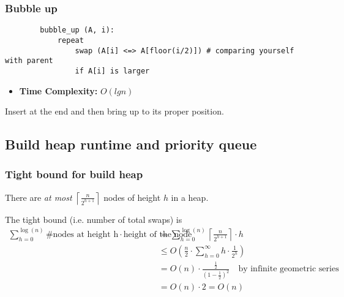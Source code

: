     \subsubsection{Bubble up}
    \begin{definition}
        \begin{lstlisting}
        bubble_up (A, i):
            repeat
                swap (A[i] <=> A[floor(i/2)]) # comparing yourself with parent
                if A[i] is larger
        \end{lstlisting}
        \begin{itemize}
            \item \textbf{Time Complexity:} $O(lg n)$
        \end{itemize}
    \end{definition}
    
    \begin{intuition}
        Insert at the end and then bring up to its proper position.
    \end{intuition}

\subsection{Build heap runtime and priority queue}
    \subsubsection{Tight bound for build heap}
    \begin{definition}
        There are \emph{at most} \( \left\lceil \frac{n}{2^{h+1}} \right\rceil \) nodes of height \( h \) in a heap.
        \vspace{1em}

        The tight bound (i.e. number of total swaps) is
        \begin{align*}
            \sum_{h=0}^{\log(n)} \text{\# nodes at height h} \cdot \text{height of the node} &= \sum_{h=0}^{\log(n)} \left\lceil \frac{n}{2^{h+1}} \right\rceil \cdot h \\
            &\leq O\left(\frac{n}{2} \cdot \sum_{h=0}^{\infty} h \cdot \frac{1}{2^h}\right) \\ 
            &= O(n) \cdot \frac{\frac{1}{2}}{(1 - \frac{1}{2})^2} \quad \text{by infinite geometric series} \\
            &= O(n) \cdot 2 = O(n)
        \end{align*}
    \end{definition}

